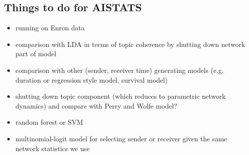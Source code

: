 \documentclass[a4paper]{article}
\begin{document}
        \subsection{Things to do for AISTATS}
        \begin{itemize}
        	\item running on Enron data
        	\item comparison with LDA in terms of topic coherence by shutting down network part of model
        	\item comparison with other (sender, receiver time) generating models (e.g. duration or regression style model, survival model)
        	\item shutting down topic component (which reduces to parametric network dynamics) and compare with Perry and Wolfe model?	
        	\item random forest or SVM
        	\item multinomial-logit model for selecting sender or receiver given the same network statistics we use
        \end{itemize}
  
\end{document}
